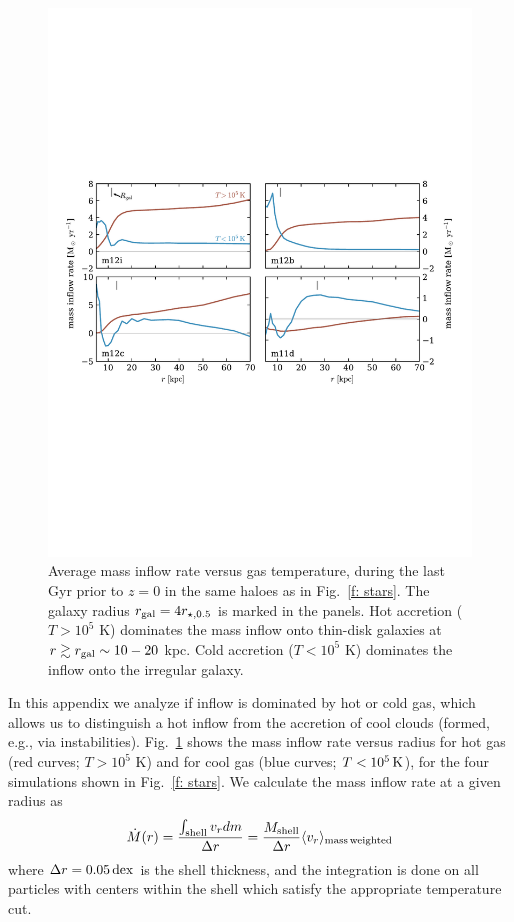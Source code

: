 \documentclass[class=article, crop=false]{standalone}
\newcommand{\Mdot}{\dot{M}}
\begin{document}
\begin{figure}
    \centering
    \includegraphics[width=\textwidth]{figures/Mdot.pdf}
    \caption{
    Average mass inflow rate versus gas temperature, during the last Gyr prior to $z=0$ in the same haloes as in Fig.~\ref{f: stars}.
    The galaxy radius $r_{\rm gal}=4 r_{\star,0.5}$ is marked in the panels. 
    Hot accretion ($T>10^5$ K) dominates the mass inflow onto thin-disk galaxies at $r \gtrsim r_{\rm gal} \sim 10-20$ kpc.
    Cold accretion ($T<10^5$ K) dominates the inflow onto the  
    irregular galaxy.
    }
    \label{f: Mdot}
\end{figure}

In this appendix we analyze if inflow is dominated by hot or cold gas, which allows us to distinguish a hot inflow from the accretion of cool clouds (formed, e.g., via instabilities).
Fig.~\ref{f: Mdot} shows the mass inflow rate versus radius for hot gas (red curves; $T>10^5$ K) and for cool gas (blue curves; $T < 10^5\,{\rm K}$),  for the four simulations shown in Fig.~\ref{f: stars}. 
We calculate the mass inflow rate at a given radius as
\begin{equation}
     \Mdot(r) = \frac{\int_{\rm shell} v_r dm}{\Delta r} = \frac{M_{\rm shell}}{\Delta r} \langle v_r\rangle_{\rm mass\, weighted}
     \label{e: Mdot}
\end{equation}
where $\Delta r=0.05\,{\rm dex}$ is the shell thickness, and the integration is done on all particles with centers within the shell which satisfy the appropriate temperature cut. 
\end{document}
